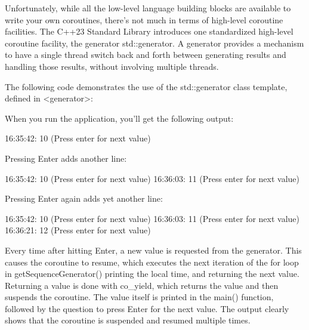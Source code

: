 
Unfortunately, while all the low-level language building blocks are available to write your own coroutines, there’s not much in terms of high-level coroutine facilities. The C++23 Standard Library introduces one standardized high-level coroutine facility, the generator std::generator. A generator provides a mechanism to have a single thread switch back and forth between generating results and handling those results, without involving multiple threads.

The following code demonstrates the use of the std::generator class template, defined in <generator>:


When you run the application, you’ll get the following output:

\begin{shell}
16:35:42: 10 (Press enter for next value)
\end{shell}

Pressing Enter adds another line:

\begin{shell}
16:35:42: 10 (Press enter for next value)
16:36:03: 11 (Press enter for next value)
\end{shell}

Pressing Enter again adds yet another line:

\begin{shell}
16:35:42: 10 (Press enter for next value)
16:36:03: 11 (Press enter for next value)
16:36:21: 12 (Press enter for next value)
\end{shell}

Every time after hitting Enter, a new value is requested from the generator. This causes the coroutine to resume, which executes the next iteration of the for loop in getSequenceGenerator() printing the local time, and returning the next value. Returning a value is done with co\_yield, which returns the value and then suspends the coroutine. The value itself is printed in the main() function, followed by the question to press Enter for the next value. The output clearly shows that the coroutine is suspended and resumed multiple times.

